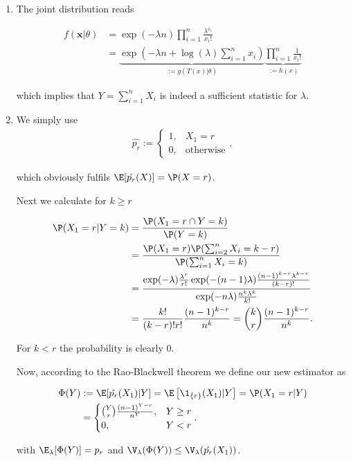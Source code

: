 \begin{solution}

\phantom{}

\begin{enumerate}[label = (\alph*)]
    \item The joint distribution reads
    
    \begin{align*}
        f(\textbf{x}|\theta) &= \exp(-\lambda n)\prod_{i=1}^n{\frac{\lambda^{x_i}}{x_i!}} \\
        &= \underbrace{\exp\left(-\lambda n + \log(\lambda)\sum_{i=1}^n x_i\right)}_{:= g(T(x)|\theta)}
        \underbrace{\prod_{i=1}^n{\frac{1}{x_i!}}}_{:=h(x)}
    \end{align*}

    which implies that $Y = \sum_{i=1}^n X_i$ is indeed a sufficient statistic for $\lambda$.

    \item We simply use
    \begin{align*}
        \hat{p_r} := \begin{cases}
            1, & X_1 = r \\
            0, & \text{otherwise}
        \end{cases},
    \end{align*}

    which obviously fulfils $\E[\hat{p_r}(X)] = \P(X = r)$.

    Next we calculate for $k \geq r$

    \begin{align*}
        \P(X_1 = r | Y = k) 
        &= \frac{\P(X_1 = r \cap Y = k)}{\P(Y = k)} \\
        &= \frac{\P(X_1 = r)\P(\sum_{i=2}^n X_i = k - r)}{\P(\sum_{i=1}^n X_i = k)} \\
        &= \frac{\exp(-\lambda)\frac{\lambda^r}{r!}\exp(-(n-1)\lambda)\frac{(n-1)^{k-r}\lambda^{k-r}}{(k-r)!}}
        {\exp(-n\lambda)\frac{n^k\lambda^k}{k!}} \\
        &= \frac{k!}{(k-r)!r!}\frac{(n-1)^{k-r}}{n^k} = \binom{k}{r}\frac{(n-1)^{k-r}}{n^k}.
    \end{align*}

    For $k < r$ the probability is clearly $0$.
    

    Now, according to the Rao-Blackwell theorem we define our new estimator
    as

    \begin{align*}
        \Phi(Y) &:= \E[\hat{p_r}(X_1)|Y] 
        = \E\left[\1_{\{r\}}(X_1)| Y\right]
        = \P(X_1 = r | Y) \\
        &= \begin{cases}
            \binom{Y}{r}\frac{(n-1)^{Y-r}}{n^Y}, & Y \geq r \\
            0, & Y < r
        \end{cases}.
    \end{align*}

    with $\E_\lambda[\Phi(Y)] = p_r$ and $\V_\lambda(\Phi(Y)) \leq \V_\lambda(\hat{p_r}(X_1))$.
    
\end{enumerate}

\end{solution}

